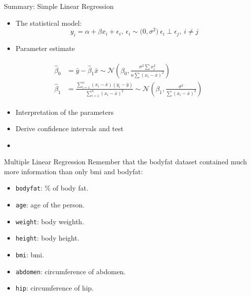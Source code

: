 \documentclass[
  10pt,
  ignorenonframetext,
]{beamer}
\providecommand{\tightlist}{%
  \setlength{\itemsep}{0pt}\setlength{\parskip}{0pt}}
\begin{document}
\begin{frame}{Summary: Simple Linear Regression}
\protect\hypertarget{summary-simple-linear-regression}{}
\begin{itemize}
\item
  The statistical model: \[
  y_i = \alpha + \beta x_i + \epsilon_i, \ \epsilon_i\sim\mathcal(0,\sigma^2)\ \epsilon_i\perp\epsilon_j,\ i\neq j
  \]
\item
  Parameter estimate
\end{itemize}

\begin{align}
\begin{aligned}
\hat{\beta}_0 &= \bar{y}-\hat{\beta}_1 \bar{x}\sim\mathcal{N}(\beta_0, \frac{\sigma^2\sum x_i^2}{n\sum(x_i-\bar{x})^2})\\
\hat{\beta}_1 &= \frac{\sum_{i=1}^n(x_i-\bar{x})(y_i-\bar{y})}{\sum_{i=1}^n(x_i-\bar{x})^2} \sim\mathcal{N}(\beta_1, \frac{\sigma^2}{\sum(x_i-\bar{x})^2})
\end{aligned}
\end{align}

\begin{itemize}
\item
  Interpretation of the parameters
\item
  Derive confidence intervals and test
\item
\end{itemize}
\end{frame}

\begin{frame}[fragile]{Multiple Linear Regression}
\protect\hypertarget{multiple-linear-regression}{}
Remember that the bodyfat dataset contained much more information than
only bmi and bodyfat:

\begin{itemize}
\tightlist
\item
  \texttt{bodyfat}: \% of body fat.
\item
  \texttt{age}: age of the person.
\item
  \texttt{weight}: body weighth.
\item
  \texttt{height}: body height.
\item
  \texttt{bmi}: bmi.
\item
  \texttt{abdomen}: circumference of abdomen.
\item
  \texttt{hip}: circumference of hip.
\end{itemize}
\end{frame}
\end{document}
